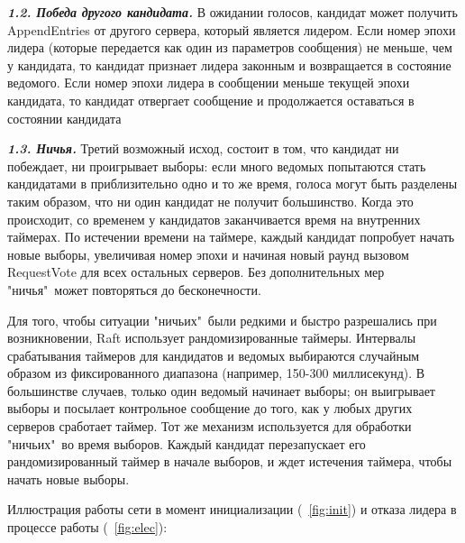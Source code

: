 \documentclass[subf, href, colorlinks=true, 14pt,
times, mtpro, specialist]{disser}
\newcommand{\figref}[1]{\figurename~\ref{#1}}
\theoremstyle{definition}
\begin{document}
\textbf{\textit{1.2. Победа другого кандидата.}}
В ожидании голосов, кандидат может получить AppendEntries от другого сервера, который является лидером. Если номер эпохи лидера (которые передается как один из параметров сообщения) не меньше, чем у кандидата, то кандидат признает лидера законным и возвращается в состояние ведомого. Если номер эпохи лидера в сообщении меньше текущей эпохи кандидата, то кандидат отвергает сообщение и продолжается оставаться в состоянии кандидата

\textbf{\textit{1.3. Ничья.}}
Третий возможный исход, состоит в том, что кандидат ни побеждает, ни проигрывает выборы: если много ведомых попытаются стать кандидатами в приблизительно одно и то же время, голоса могут быть разделены таким образом, что ни один кандидат не получит большинство. Когда это происходит, со временем у кандидатов заканчивается время на внутренних таймерах. По истечении времени на таймере, каждый кандидат попробует начать новые выборы, увеличивая номер эпохи и начиная новый раунд вызовом RequestVote для всех остальных серверов. Без дополнительных мер "ничья"\ может повторяться до бесконечности. 

Для того, чтобы ситуации "ничьих"\ были редкими и быстро разрешались при возникновении, Raft использует рандомизированные таймеры. Интервалы срабатывания таймеров для кандидатов и ведомых выбираются случайным образом из фиксированного диапазона (например, 150-300 миллисекунд). В большинстве случаев, только один ведомый начинает выборы; он выигрывает выборы и посылает контрольное сообщение до того, как у любых других серверов сработает таймер. Тот же механизм используется для обработки "ничьих"\ во время выборов. Каждый кандидат перезапускает его рандомизированный таймер в начале выборов, и ждет истечения таймера, чтобы начать новые выборы. 

Иллюстрация работы сети в момент инициализации (\figref{fig:init}) и отказа лидера в процессе работы (\figref{fig:elec}):

\end{document}

